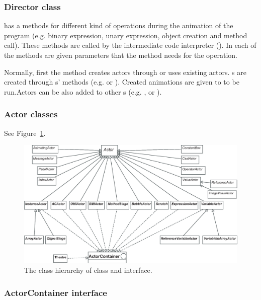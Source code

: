\subsubsection{Director class}

 has a methods for different kind of operations during the
animation of the program (e.g. binary expression, unary expression,
object creation and method call). These methods are called by the intermediate code
interpreter (). In each of the methods are given parameters
that the method needs for the operation.

Normally, first the method creates actors through 
or uses existing actors. s are created through s' methods
(e.g.  or ). Created animations are given to
 to be run.Actors can be also added to other
s (e.g. ,  or
).

\subsubsection{Actor classes}

See Figure~\ref{fig:class_hierarchy_of_Actor_class_small}.

\begin{figure}[!htb]
\begin{center}
\includegraphics[width=\textwidth]{images/jeliot_actor_class_small.eps}
\caption{The class hierarchy of  class and  interface.}
\label{fig:class_hierarchy_of_Actor_class_small}
\end{center}
\end{figure}

\subsubsection{ActorContainer interface}

